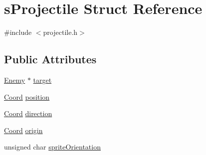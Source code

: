 \hypertarget{structs_projectile}{\section{s\-Projectile Struct Reference}
\label{structs_projectile}
}


{\ttfamily \#include $<$projectile.\-h$>$}

\subsection*{Public Attributes}
\begin{DoxyCompactItemize}
\item 
\hyperlink{enemy_8h_ae3ac1c5e4d43de724487dfc83b509fd4}{Enemy} $\ast$ \hyperlink{structs_projectile_a3b940e8b5370b3c328d2ed3d9924dc8d}{target}
\item 
\hyperlink{coordonates_8h_aff9d4468ac7a973ce7e5cfb5bd39bc33}{Coord} \hyperlink{structs_projectile_a17ae15a48cf473955980cfe76227b617}{position}
\item 
\hyperlink{coordonates_8h_aff9d4468ac7a973ce7e5cfb5bd39bc33}{Coord} \hyperlink{structs_projectile_a1bb47c3b0ac3cbe0230b2bb12b5c37fe}{direction}
\item 
\hyperlink{coordonates_8h_aff9d4468ac7a973ce7e5cfb5bd39bc33}{Coord} \hyperlink{structs_projectile_ae5186a452bdc7b1b3a712347792e10bc}{origin}
\item 
unsigned char \hyperlink{structs_projectile_af4c8bfd3ea9e1b73ae510505ff9f1ae4}{sprite\-Orientation}
\end{DoxyCompactItemize}


